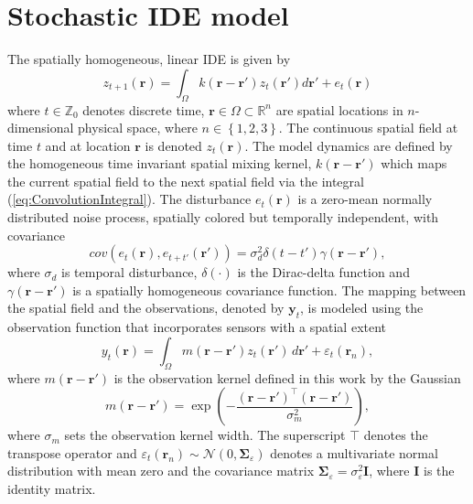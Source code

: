 \documentclass[10pt,twocolumn,twoside]{IEEEtran}
\begin{document}
\section{Stochastic IDE model}
The spatially homogeneous, linear IDE is given by
\begin{equation}
 z_{t+1}\left(\mathbf{r}\right)=\int_{\Omega}k\left(\mathbf{r}-\mathbf{r}'\right)z_{t}\left(\mathbf{r}'\right)d\mathbf{r}'+e_{t}\left(\mathbf{r}\right)
\label{eq:ConvolutionIntegral}
\end{equation}
where $t\in \mathbb{Z}_0 $ denotes discrete time, $\mathbf{r} \in \Omega \subset \mathbb{R}^{n}$ are spatial locations in $n$-dimensional physical space, where $n \in \left\lbrace 1,2,3 \right\rbrace $. The continuous spatial field at time $t$ and at location $\mathbf r$ is denoted $z_t\left(\mathbf r\right)$. The model dynamics  are defined by the homogeneous time invariant spatial mixing kernel, $k\left(\mathbf{r}-\mathbf{r}'\right)$ which maps the current spatial field to the next spatial field via the integral (\ref{eq:ConvolutionIntegral}). The disturbance $e_{t}(\mathbf{r})$ is a zero-mean normally distributed noise process, spatially colored but temporally independent, with covariance \cite{Rasmussen2005}
\begin{equation}
cov\left(e_{t}\left(\mathbf{r}\right),e_{t+t'}\left(\mathbf{r'}\right)\right)=\sigma_d^2\delta(t-t')\gamma(\mathbf{r}-\mathbf{r'}),
\label{eq:FieldDisturbance}
\end{equation}
where $\sigma_d$ is temporal disturbance, $\delta(\cdot)$ is the Dirac-delta function and $\gamma(\mathbf{r}-\mathbf{r'})$ is a spatially homogeneous covariance function. The mapping between the spatial field and the observations, denoted by $\mathbf{y}_t$, is modeled using the observation function that incorporates sensors with a spatial extent
\begin{equation}\label{eq:ObservationEquation}
	y_t(\mathbf{r}) = \int_{\Omega} { m\left(\mathbf{r}-\mathbf{r}'\right) z_t\left(\mathbf{r}'\right) \, d\mathbf{r}'} + \varepsilon_t(\mathbf{r}_n), 
\end{equation}
where $m\left(\mathbf{r}-\mathbf{r}'\right)$ is the observation kernel defined in this work by the Gaussian
\begin{equation}\label{eq:observationkernel}
	m\left(\mathbf{r}-\mathbf{r}'\right) = \exp{\left(-\frac{(\mathbf{r}-\mathbf{r}')^\top(\mathbf{r}-\mathbf{r}')}{\sigma_m^2}\right)},
\end{equation}
where $\sigma_m$ sets the observation kernel width. The superscript $\top$ denotes the transpose operator and $\varepsilon_t(\mathbf{r}_n) \sim \mathcal{N}\left(0,\boldsymbol{\Sigma}_{\varepsilon}\right)$ denotes a multivariate normal distribution with mean zero and the covariance matrix $\boldsymbol{\Sigma}_{\varepsilon} = \sigma_{\varepsilon}^2\mathbf{I}$, where $\mathbf{I}$ is the identity matrix.
\end{document}
